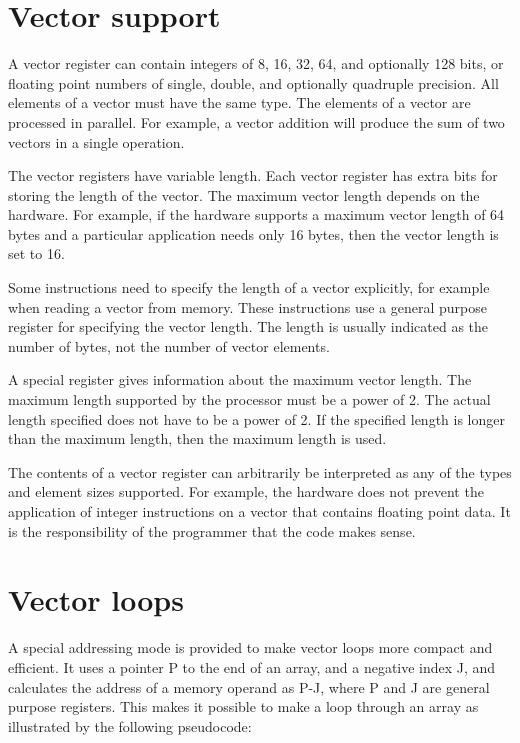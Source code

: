 \documentclass[forwardcom.tex]{subfiles}
\begin{document}
\section{Vector support}
A vector register can contain integers of 8, 16, 32, 64, and optionally 128 bits, or floating point numbers of single, double, and optionally quadruple precision. All elements of a vector must have the same type. The elements of a vector are processed in parallel. For example, a vector addition will produce the sum of two vectors in a single operation.
\vspace{2mm}

The vector registers have variable length. Each vector register has extra bits for storing the length of the vector. The maximum vector length depends on the hardware. 
For example, if the hardware supports a maximum vector length of 64 bytes and a particular application needs only 16 bytes, then the vector length is set to 16.
\vspace{2mm}

Some instructions need to specify the length of a vector explicitly, for example when reading a vector from memory. These instructions use a general purpose register for specifying the vector length. The length is usually indicated as the number of bytes, not the number of vector elements.
\vspace{2mm}

A special register gives information about the maximum vector length. The maximum length supported by the processor must be a power of 2. The actual length specified does not have to be a power of 2. If the specified length is longer than the maximum length, then the maximum length is used.
\vspace{2mm}

The contents of a vector register can arbitrarily be interpreted as any of the types and element sizes supported. For example, the hardware does not prevent the application of integer instructions on a vector that contains floating point data. It is the responsibility of the programmer that the code makes sense.

\section{Vector loops} \label{vectorLoops}
A special addressing mode is provided to make vector loops more compact and efficient. It uses a pointer P to the end of an array, and a negative index J, and calculates the address of a memory operand as P-J, where P and J are general purpose registers. This makes it possible to make a loop through an array as illustrated by the following pseudocode:
\end{document}
